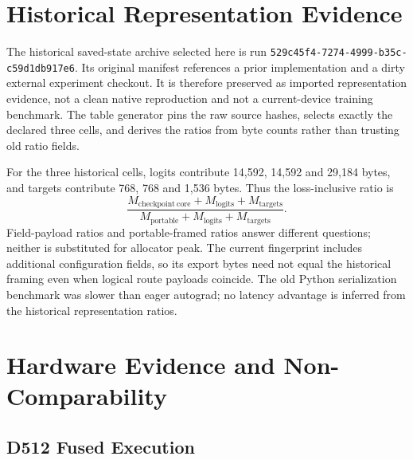 \section{Historical Representation Evidence}
\label{app:legacy-state}

The historical saved-state archive selected here is run
\nolinkurl{529c45f4-7274-4999-b35c-c59d1db917e6}. Its original manifest references
a prior implementation and a dirty external experiment checkout. It is
therefore preserved as imported representation evidence, not a clean native
reproduction and not a current-device training benchmark. The table generator
pins the raw source hashes, selects exactly the declared three cells, and
derives the ratios from byte counts rather than trusting old ratio fields.

\begin{table}[h]
\centering
\caption{Historical portable-tape accounting only. ``Cotan.'' is declared
checkpoint-core bytes divided by portable bytes; ``Loss'' adds logits and
int64 targets symmetrically. The checkpoint set is shape-derived, not a
measured optimal policy or allocator peak. These rows are not pooled with
Table~\ref{tab:current-state}.}
\small

\end{table}

For the three historical cells, logits contribute 14,592, 14,592 and
29,184 bytes, and targets contribute 768, 768 and 1,536 bytes. Thus the
loss-inclusive ratio is
\begin{equation}
 \frac{M_{\mathrm{checkpoint\ core}}+M_{\mathrm{logits}}+M_{\mathrm{targets}}}
      {M_{\mathrm{portable}}+M_{\mathrm{logits}}+M_{\mathrm{targets}}}.
\end{equation}
Field-payload ratios and portable-framed ratios answer different questions;
neither is substituted for allocator peak. The current fingerprint includes
additional configuration fields, so its export bytes need not equal the
historical framing even when logical route payloads coincide. The old
Python serialization benchmark was slower than eager autograd; no latency
advantage is inferred from the historical representation ratios.

\section{Hardware Evidence and Non-Comparability}
\label{app:hardware}

\subsection{D512 Fused Execution}

